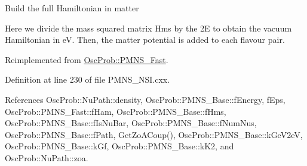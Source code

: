 Build the full Hamiltonian in matter

Here we divide the mass squared matrix Hms by the 2E to obtain the vacuum Hamiltonian in eV. Then, the matter potential is added to each flavour pair. 

Reimplemented from \hyperlink{classOscProb_1_1PMNS__Fast_a16248082308f9d2c332ebf1be0aa90c3}{Osc\+Prob\+::\+P\+M\+N\+S\+\_\+\+Fast}.



Definition at line 230 of file P\+M\+N\+S\+\_\+\+N\+S\+I.\+cxx.



References Osc\+Prob\+::\+Nu\+Path\+::density, Osc\+Prob\+::\+P\+M\+N\+S\+\_\+\+Base\+::f\+Energy, f\+Eps, Osc\+Prob\+::\+P\+M\+N\+S\+\_\+\+Fast\+::f\+Ham, Osc\+Prob\+::\+P\+M\+N\+S\+\_\+\+Base\+::f\+Hms, Osc\+Prob\+::\+P\+M\+N\+S\+\_\+\+Base\+::f\+Is\+Nu\+Bar, Osc\+Prob\+::\+P\+M\+N\+S\+\_\+\+Base\+::f\+Num\+Nus, Osc\+Prob\+::\+P\+M\+N\+S\+\_\+\+Base\+::f\+Path, Get\+Zo\+A\+Coup(), Osc\+Prob\+::\+P\+M\+N\+S\+\_\+\+Base\+::k\+Ge\+V2eV, Osc\+Prob\+::\+P\+M\+N\+S\+\_\+\+Base\+::k\+Gf, Osc\+Prob\+::\+P\+M\+N\+S\+\_\+\+Base\+::k\+K2, and Osc\+Prob\+::\+Nu\+Path\+::zoa.


